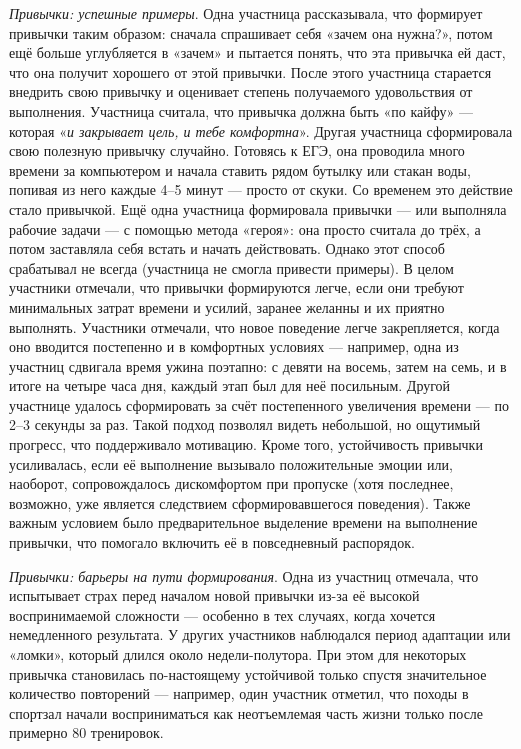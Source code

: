 \documentclass[pdflatex,sn-mathphys-num]{sn-jnl}%
\theoremstyle{thmstyleone}%
\theoremstyle{thmstyletwo}%
\theoremstyle{thmstylethree}%
\begin{document}
\textit{Привычки: успешные примеры}. Одна участница рассказывала, что формирует привычки таким образом: сначала спрашивает себя «зачем она нужна?», потом ещё больше углубляется в «зачем» и пытается понять, что эта привычка ей даст, что она получит хорошего от этой привычки. После этого участница старается внедрить свою привычку и оценивает степень получаемого удовольствия от выполнения. Участница считала, что привычка должна быть «по кайфу» — которая «\textit{и закрывает цель, и тебе комфортна}». Другая участница сформировала свою полезную привычку случайно. Готовясь к ЕГЭ, она проводила много времени за компьютером и начала ставить рядом бутылку или стакан воды, попивая из него каждые 4–5 минут — просто от скуки. Со временем это действие стало привычкой. Ещё одна участница формировала привычки — или выполняла рабочие задачи — с помощью метода «героя»: она просто считала до трёх, а потом заставляла себя встать и начать действовать. Однако этот способ срабатывал не всегда (участница не смогла привести примеры). В целом участники отмечали, что привычки формируются легче, если они требуют минимальных затрат времени и усилий, заранее желанны и их приятно выполнять. Участники отмечали, что новое поведение легче закрепляется, когда оно вводится постепенно и в комфортных условиях — например, одна из участниц сдвигала время ужина поэтапно: с девяти на восемь, затем на семь, и в итоге на четыре часа дня, каждый этап был для неё посильным. Другой участнице удалось сформировать за счёт постепенного увеличения времени — по 2–3 секунды за раз. Такой подход позволял видеть небольшой, но ощутимый прогресс, что поддерживало мотивацию. Кроме того, устойчивость привычки усиливалась, если её выполнение вызывало положительные эмоции или, наоборот, сопровождалось дискомфортом при пропуске (хотя последнее, возможно, уже является следствием сформировавшегося поведения). Также важным условием было предварительное выделение времени на выполнение привычки, что помогало включить её в повседневный распорядок.

\textit{Привычки: барьеры на пути формирования}. Одна из участниц отмечала, что испытывает страх перед началом новой привычки из-за её высокой воспринимаемой сложности — особенно в тех случаях, когда хочется немедленного результата. У других участников наблюдался период адаптации или «ломки», который длился около недели-полутора. При этом для некоторых привычка становилась по-настоящему устойчивой только спустя значительное количество повторений — например, один участник отметил, что походы в спортзал начали восприниматься как неотъемлемая часть жизни только после примерно 80 тренировок. 
\end{document}
